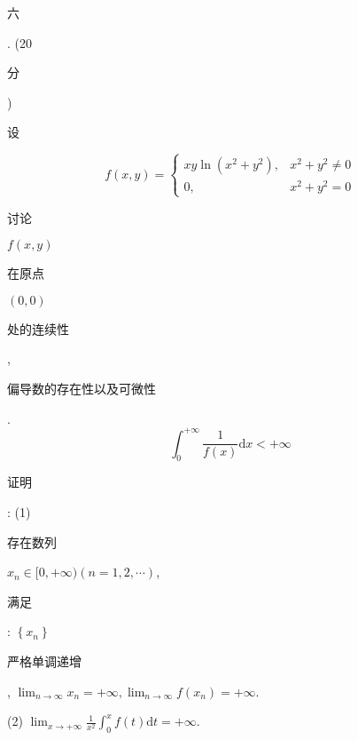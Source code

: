 \documentclass[10pt]{article}
\begin{document}
\begin{CJK}{UTF8}{mj}六\end{CJK}. (20 \begin{CJK}{UTF8}{mj}分\end{CJK}) \begin{CJK}{UTF8}{mj}设\end{CJK}
$$
f(x, y)= \begin{cases}x y \ln \left(x^{2}+y^{2}\right), & x^{2}+y^{2} \neq 0 \\ 0, & x^{2}+y^{2}=0\end{cases}
$$
\begin{CJK}{UTF8}{mj}讨论\end{CJK} $f(x, y)$ \begin{CJK}{UTF8}{mj}在原点\end{CJK} $(0,0)$ \begin{CJK}{UTF8}{mj}处的连续性\end{CJK}, \begin{CJK}{UTF8}{mj}偏导数的存在性以及可微性\end{CJK}.
$$
\int_{0}^{+\infty} \frac{1}{f(x)} \mathrm{d} x<+\infty
$$
\begin{CJK}{UTF8}{mj}证明\end{CJK}: (1) \begin{CJK}{UTF8}{mj}存在数列\end{CJK} $x_{n} \in[0,+\infty)(n=1,2, \cdots)$, \begin{CJK}{UTF8}{mj}满足\end{CJK}: $\left\{x_{n}\right\}$ \begin{CJK}{UTF8}{mj}严格单调递增\end{CJK}, $\lim _{n \rightarrow \infty} x_{n}=+\infty, \lim _{n \rightarrow \infty} f\left(x_{n}\right)=+\infty$.

(2) $\lim _{x \rightarrow+\infty} \frac{1}{x^{2}} \int_{0}^{x} f(t) \mathrm{d} t=+\infty$.
\end{document}
